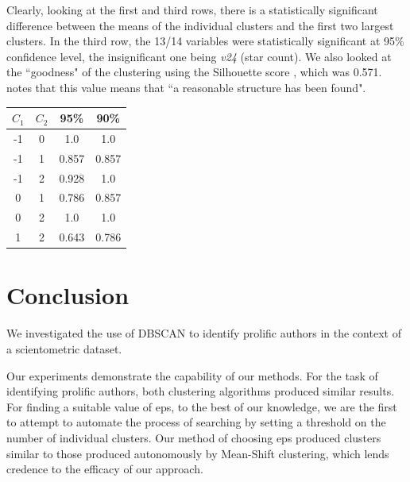 \documentclass[12pt,a4paper,twocolumn]{article}
\begin{document}
	Clearly, looking at the first and third rows, there is a statistically significant difference between the means of the individual clusters and the first two largest clusters. In the third row, the 13/14 variables were statistically significant at 95\% confidence level, the insignificant one being \textit{v24} (star count). We also looked at the ``goodness" of the clustering using the Silhouette score \cite{rousseeuw1987silhouettes}, which was 0.571. \cite{kaufman2009finding} notes that this value means that ``a reasonable structure has been found".\\
	
	\begin{tabular}{|c|c|c|c|}
		\hline 
		$C_1$ & $C_2$ & \textbf{95\%} & \textbf{90\%} \\ 
		\hline 
		-1 & 0 & 1.0 & 1.0 \\ 
		\hline 
		-1 & 1 & 0.857 & 0.857 \\ 
		\hline 
		-1 & 2 & 0.928 & 1.0 \\ 
		\hline 
		0 & 1 & 0.786 & 0.857 \\ 
		\hline 
		0 & 2 & 1.0 & 1.0 \\ 
		\hline 
		1 & 2 & 0.643 & 0.786 \\ 
		\hline 
	\end{tabular} 
	\begingroup
	\endgroup
	\hfill\break
	
	\section{Conclusion}
	We investigated the use of DBSCAN to identify prolific authors in the context of a scientometric dataset.
	
	Our experiments demonstrate the capability of our methods.  For the task of identifying prolific authors, both clustering algorithms produced similar results. For finding a suitable value of eps, to the best of our knowledge, we are the first to attempt to automate the process of searching by setting a threshold on the number of individual clusters. Our method of choosing eps produced clusters similar to those produced autonomously by Mean-Shift clustering, which lends credence to the efficacy of our approach.
	
	
	
\end{document}
